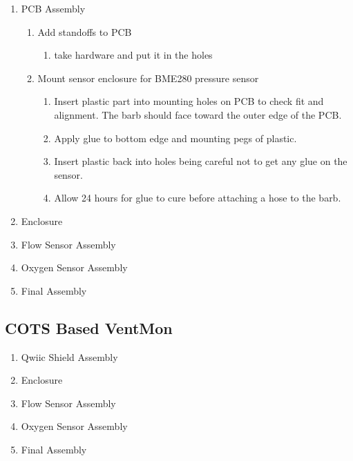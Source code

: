 \documentclass[11pt, letterpaper]{article}
\begin{document}
\begin{enumerate}
\item
PCB Assembly

\begin{enumerate}[label=1.\arabic*]
\item Add standoffs to PCB
\begin{enumerate}[label=1.1.\arabic*]
\item take hardware and put it in the holes
\end{enumerate}

\item Mount sensor enclosure for BME280 pressure sensor
\begin{enumerate}[label=1.2.\arabic*]
\item Insert plastic part into mounting holes on PCB to check fit and alignment. The barb should face toward the outer edge of the PCB.
\item Apply glue to bottom edge and mounting pegs of plastic.
\item Insert plastic back into holes being careful not to get any glue on the sensor.
\item Allow 24 hours for glue to cure before attaching a hose to the barb.
\end{enumerate}


\end{enumerate}



\item
Enclosure

\item
Flow Sensor Assembly

\item
Oxygen Sensor Assembly

\item
Final Assembly

\end{enumerate}

\subsection{COTS Based VentMon}
\begin{enumerate}

\item
Qwiic Shield Assembly

\item
Enclosure

\item
Flow Sensor Assembly

\item
Oxygen Sensor Assembly

\item
Final Assembly

\end{enumerate}
\end{document}
